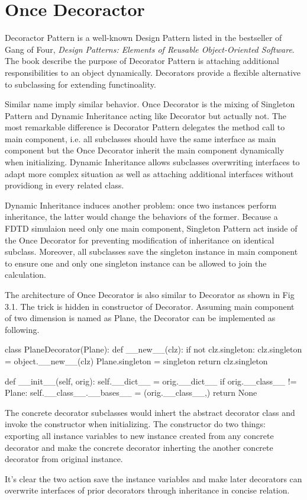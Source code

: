 \section{Once Decoractor}
Decoractor Pattern is a well-known Design Pattern listed in the bestseller of Gang of Four, \textit{Design Patterns:
  Elements of Reusable Object-Oriented Software}. The book describe the purpose of Decorator Pattern is attaching
additional responsibilities to an object dynamically. Decorators provide a flexible alternative to subclassing for
extending functinoality.

Similar name imply similar behavior. Once Decorator is the mixing of Singleton Pattern and Dynamic Inheritance acting
like Decorator but actually not. The most remarkable difference is Decorator Pattern delegates the method call to main
component, i.e. all subclasses should have the same interface as main component but the Once Decorator inherit the main
component dynamically when initializing. Dynamic Inheritance allows subclasses overwriting interfaces to adapt more
complex situation as well as attaching additional interfaces without providiong in every related class.

Dynamic Inheritance induces another problem: once two instances perform inheritance, the latter would change the
behaviors of the former. Because a FDTD simulaion need only one main component, Singleton Pattern act inside of the Once
Decorator for preventing modification of inheritance on identical subclass. Moreover, all subclasses save the singleton
instance in main component to ensure one and only one singleton instance can be allowed to join the calculation.

The architecture of Once Decorator is also similar to Decorator as shown in Fig 3.1. The trick is hidden in constructor
of Decorator. Assuming main component of two dimension is named as Plane, the Decorator can be implemented as following.
\begin{code}
  class PlaneDecorator(Plane):
    def __new__(clz):
        if not clz.singleton:
            clz.singleton = object.__new__(clz)
            Plane.singleton = singleton
        return clz.singleton

    def __init__(self, orig):
        self.__dict__ = orig.__dict__
        if orig.__class__ != Plane:
            self.__class__.__bases__ = (orig.__class__,)
        return None
\end{code}
The concrete decorator subclasses would inhert the abstract decorator class and invoke the constructor when
initializing. The constructor do two things: exporting all instance variables to new instance created from any concrete
decorator and make the concrete decorator inherting the another concrete decorator from original instance.

It's clear the two action save the instance variables and make later decorators can overwrite interfaces of prior
decorators through inheritance in concise relation.
